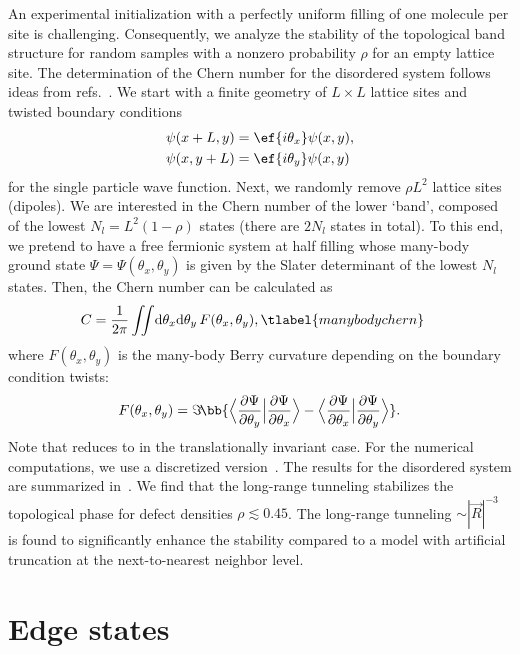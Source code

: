 An experimental initialization with a perfectly uniform filling of one molecule per site is challenging.
Consequently, we analyze the stability of the topological band structure for random samples with a nonzero probability $\rho$ for an empty lattice site.
The determination of the Chern number for the disordered system follows ideas from refs.~\cite{Niu1985,Avron1985}.
We start with a finite geometry of $L \times L$ lattice sites and twisted boundary conditions
\begin{align}
    \psi(x + L, y) &= \ef{i\theta_x}\psi(x, y), \\
    \psi(x, y + L) &= \ef{i\theta_y}\psi(x, y)
\end{align}
for the single particle wave function.
Next, we randomly remove $\rho L^2$ lattice sites (dipoles).
We are interested in the Chern number of the lower `band', composed of the lowest $N_l=L^2 (1-\rho)$ states (there are $2N_l$ states in total).
To this end, we pretend to have a free fermionic system at half filling whose many-body ground state $\Psi=\Psi(\theta_x, \theta_y)$ is given by the Slater determinant of the lowest $N_l$ states.
Then, the Chern number can be calculated as
\begin{align}
    C &= \frac{1}{2\pi}\iint\!\mathrm{d}\theta_x \mathrm{d}\theta_y \, F(\theta_x, \theta_y), \tlabel{manybodychern}
\end{align}
where $F(\theta_x, \theta_y)$ is the many-body Berry curvature depending on the boundary condition twists:
\begin{align}
    F(\theta_x,\theta_y)=\Im\!\bb{ {\Big\langle\frac{\partial \Psi}{\partial \theta_y}\Big|\frac{\partial \Psi}{\partial \theta_x}\Big\rangle - \Big\langle\frac{\partial \Psi}{\partial \theta_x}\Big|\frac{\partial \Psi}{\partial \theta_y}\Big\rangle} }.
\end{align}
Note that  reduces to  in the translationally invariant case.
For the numerical computations, we use a discretized version~\cite{Fukui2005}.
The results for the disordered system are summarized in~.
We find that the long-range tunneling stabilizes the topological phase for defect densities $\rho\lesssim 0.45$.
The long-range tunneling ${\sim}|\vec{R}|^{-3}$ is found to significantly enhance the stability compared to a model with artificial truncation at the next-to-nearest neighbor level.

\section{Edge states}

